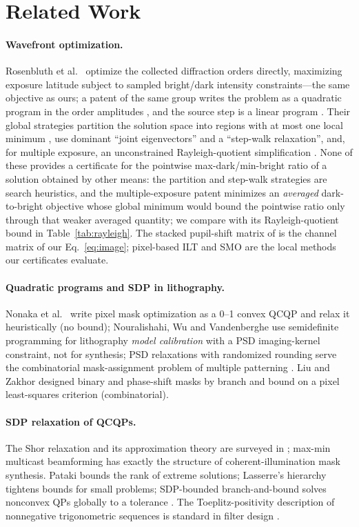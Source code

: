 \documentclass[11pt,a4paper]{article}
\theoremstyle{remark}\newtheorem*{remark}{Remark}
\begin{document}
\section{Related Work}
\paragraph{Wavefront optimization.} Rosenbluth et al.\ \cite{rosenbluth2002,rosenbluth2007} optimize the collected diffraction orders directly, maximizing exposure latitude subject to sampled bright/dark intensity constraints---the same objective as ours; a patent of the same group writes the problem as a quadratic program in the order amplitudes \cite{ibm_patents}, and the source step is a linear program \cite{rosenbluth2006}. Their global strategies partition the solution space into regions with at most one local minimum \cite{rosenbluth2007}, use dominant ``joint eigenvectors'' and a ``step-walk relaxation'', and, for multiple exposure, an unconstrained Rayleigh-quotient simplification \cite{ibm_patents}. None of these provides a certificate for the pointwise max-dark/min-bright ratio of a solution obtained by other means: the partition and step-walk strategies are search heuristics, and the multiple-exposure patent minimizes an \emph{averaged} dark-to-bright objective whose global minimum would bound the pointwise ratio only through that weaker averaged quantity; we compare with its Rayleigh-quotient bound in Table~\ref{tab:rayleigh}. The stacked pupil-shift matrix of \cite{yamazoe2008} is the channel matrix of our Eq.~\eqref{eq:image}; pixel-based ILT \cite{granik2006,poonawala2007} and SMO \cite{socha2005} are the local methods our certificates evaluate.
\paragraph{Quadratic programs and SDP in lithography.} Nonaka et al.\ \cite{nonaka2025} write pixel mask optimization as a 0--1 convex QCQP and relax it heuristically (no bound); Nouralishahi, Wu and Vandenberghe \cite{nouralishahi2008} use semidefinite programming for lithography \emph{model calibration} with a PSD imaging-kernel constraint, not for synthesis; PSD relaxations with randomized rounding serve the combinatorial mask-assignment problem of multiple patterning \cite{kohira2016}. Liu and Zakhor \cite{liu1990,liu1992} designed binary and phase-shift masks by branch and bound on a pixel least-squares criterion (combinatorial).
\paragraph{SDP relaxation of QCQPs.} The Shor relaxation and its approximation theory are surveyed in \cite{luo2010}; max-min multicast beamforming \cite{sidiropoulos2006} has exactly the structure of coherent-illumination mask synthesis. Pataki \cite{pataki1998} bounds the rank of extreme solutions; Lasserre's hierarchy \cite{lasserre2001} tightens bounds for small problems; SDP-bounded branch-and-bound solves nonconvex QPs globally to a tolerance \cite{burer2008}. The Toeplitz-positivity description of nonnegative trigonometric sequences is standard in filter design \cite{davidson2002,dumitrescu2007}.
\end{document}
